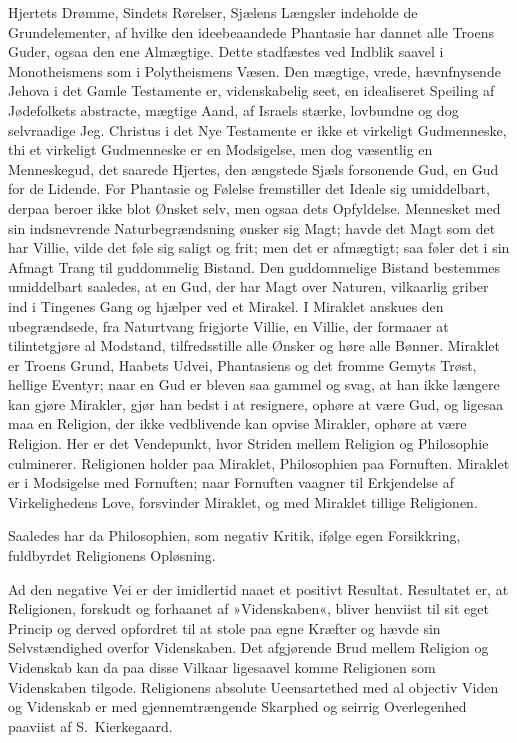 \documentclass[12pt,a4paper]{article}
\begin{document}
Hjertets Drømme, Sindets Rørelser, Sjælens Længsler indeholde
de Grundelementer, af hvilke den ideebeaandede Phantasie har
dannet alle Troens Guder, ogsaa den ene Almægtige. Dette
stadfæstes ved Indblik saavel i Monotheismens som i
Polytheismens Væsen. Den mægtige, vrede, hævnfnysende Jehova i
det Gamle Testamente er, videnskabelig seet, en idealiseret
Speiling af Jødefolkets abstracte, mægtige Aand, af Israels
stærke, lovbundne og dog selvraadige Jeg. Christus i det Nye
Testamente er ikke et virkeligt Gudmenneske, thi et virkeligt
Gudmenneske er en Modsigelse, men dog væsentlig en Menneskegud,
det saarede Hjertes, den ængstede Sjæls forsonende Gud, en Gud
for de Lidende. For Phantasie og Følelse fremstiller det Ideale
sig umiddelbart, derpaa beroer ikke blot Ønsket selv, men ogsaa
dets Opfyldelse. Mennesket med sin indsnevrende
Naturbegrændsning ønsker sig Magt; havde det Magt som det har
Villie, vilde det føle sig saligt og frit; men det er afmægtigt;
saa føler det i sin Afmagt Trang til guddommelig Bistand. Den
guddommelige Bistand bestemmes umiddelbart saaledes, at en Gud,
der har Magt over Naturen, vilkaarlig griber ind i Tingenes Gang
og hjælper ved et Mirakel. I Miraklet anskues den ubegrændsede,
fra Naturtvang frigjorte Villie, en Villie, der formaaer at
tilintetgjøre al Modstand, tilfredsstille alle Ønsker og høre
alle Bønner. Miraklet er Troens Grund, Haabets Udvei,
Phantasiens og det fromme Gemyts Trøst, hellige Eventyr; naar
en Gud er bleven saa gammel og svag, at han ikke længere kan
gjøre Mirakler, gjør han bedst i at resignere, ophøre at være
Gud, og ligesaa maa en Religion, der ikke vedblivende kan
opvise Mirakler, ophøre at være Religion. Her er det
Vendepunkt, hvor Striden mellem Religion og Philosophie
culminerer. Religionen holder paa Miraklet, Philosophien paa
Fornuften. Miraklet er i Modsigelse med Fornuften; naar
Fornuften vaagner til Erkjendelse af Virkelighedens Love,
forsvinder Miraklet, og med Miraklet tillige Religionen.

Saaledes har da Philosophien, som negativ Kritik, ifølge egen
Forsikkring, fuldbyrdet Religionens Opløsning.

Ad den negative Vei er der imidlertid naaet et positivt
Resultat. Resultatet er, at Religionen, forskudt og forhaanet
af »Videnskaben«, bliver henviist til sit eget Princip og
derved opfordret til at stole paa egne Kræfter og hævde sin
Selvstændighed overfor Videnskaben. Det afgjørende Brud mellem
Religion og Videnskab kan da paa disse Vilkaar ligesaavel komme
Religionen som Videnskaben tilgode. Religionens absolute
Ueensartethed med al objectiv Viden og Videnskab er med
gjennemtrængende Skarphed og seirrig Overlegenhed paaviist af
S.\ Kierkegaard.
\end{document}
